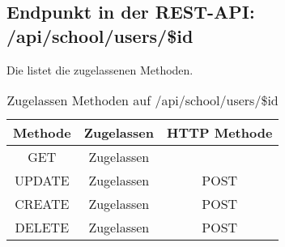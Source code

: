 \subsection{Endpunkt in der REST-API: /api/school/users/\$id}
Die  listet die zugelassenen Methoden. 

\begin{table}[!htbp]
	\begin{tabular}{|c|c|c|}
		\hline
			\textbf{Methode} & \textbf{Zugelassen} & \textbf{HTTP Methode} \\ \hline
			GET & Zugelassen &  \\ \hline
			UPDATE & Zugelassen & POST \\ \hline 
			CREATE & Zugelassen & POST \\ \hline 
			DELETE & Zugelassen & POST \\ \hline
	\end{tabular}

		\caption{Zugelassen Methoden auf /api/school/users/\$id}
		\label{tab:end:rest:api:school:users:id:meth}
\end{table}

